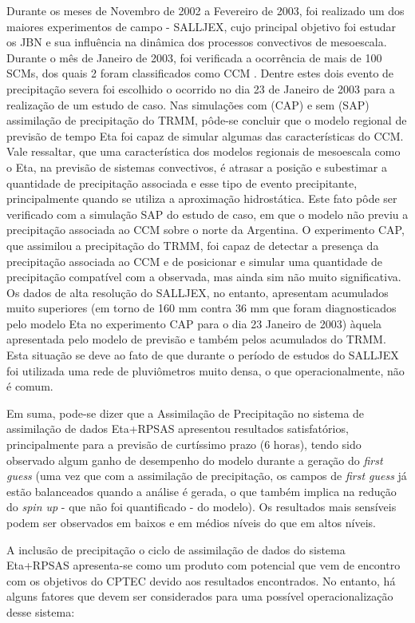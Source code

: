 Durante os meses de Novembro de 2002 a Fevereiro de 2003, foi realizado um dos maiores experimentos de campo - SALLJEX, cujo principal objetivo foi estudar os JBN e sua influência na dinâmica dos processos convectivos de mesoescala. Durante o mês de Janeiro de 2003, foi verificada a ocorrência de mais de 100 SCMs, dos quais 2 foram classificados como CCM \cite{zipseretal04}. Dentre estes dois evento de precipitação severa foi escolhido o ocorrido no dia 23 de Janeiro de 2003 para a realização de um estudo de caso. Nas simulações com (CAP) e sem (SAP) assimilação de precipitação do TRMM, pôde-se concluir que o modelo regional de previsão de tempo Eta foi capaz de simular algumas das características do CCM. Vale ressaltar, que uma característica dos modelos regionais de mesoescala como o Eta, na previsão de sistemas convectivos, é atrasar a posição e subestimar a quantidade de precipitação associada e esse tipo de evento precipitante, principalmente quando se utiliza a aproximação hidrostática. Este fato pôde ser verificado com a simulação SAP do estudo de caso, em que o modelo não previu a precipitação associada ao CCM sobre o norte da Argentina. O experimento CAP, que assimilou a precipitação do TRMM, foi capaz de detectar a presença da precipitação associada ao CCM e de posicionar e simular uma quantidade de precipitação compatível com a observada, mas ainda sim não muito significativa. Os dados de alta resolução do SALLJEX, no entanto, apresentam acumulados muito superiores (em torno de 160 mm contra 36 mm que foram diagnosticados pelo modelo Eta no experimento CAP para o dia 23 Janeiro de 2003) àquela apresentada pelo modelo de previsão e também pelos acumulados do TRMM. Esta situação se deve ao fato de que durante o período de estudos do SALLJEX foi utilizada uma rede de pluviômetros muito densa, o que operacionalmente, não é comum.

Em suma, pode-se dizer que a Assimilação de Precipitação no sistema de assimilação de dados Eta+RPSAS apresentou resultados satisfatórios, principalmente para a previsão de curtíssimo prazo (6 horas), tendo sido observado algum ganho de desempenho do modelo durante a geração do \textit{first guess} (uma vez que com a assimilação de precipitação, os campos de \textit{first guess} já estão balanceados quando a análise é gerada, o que também implica na redução do \textit{spin up} - que não foi quantificado - do modelo). Os resultados mais sensíveis podem ser observados em baixos e em médios níveis do que em altos níveis.

A inclusão de precipitação o ciclo de assimilação de dados do sistema Eta+RPSAS apresenta-se como um produto com potencial que vem de encontro com os objetivos do CPTEC devido aos resultados encontrados. No entanto, há alguns fatores que devem ser considerados para uma possível operacionalização desse sistema:

